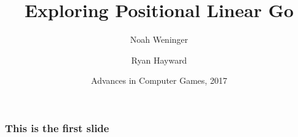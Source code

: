 \documentclass{beamer}
\title{Exploring Positional Linear Go}
\author[Weninger, Hayward]
{Noah Weninger \and Ryan Hayward}
\institute[University of Alberta]
{
  Department of Computing Science\\
  University of Alberta\\
  Canada
}
\date[ACG 2017]
{Advances in Computer Games, 2017}
\begin{document}
    \frame{\titlepage}

    \begin{frame}
        \frametitle{This is the first slide}
    \end{frame}
\end{document}
